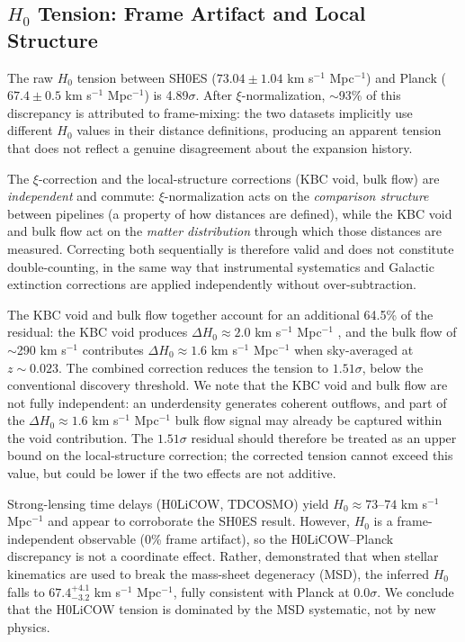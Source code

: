 \documentclass[twocolumn]{aastex631}
\begin{document}
\subsection{$H_0$ Tension: Frame Artifact and Local Structure}

The raw $H_0$ tension between SH0ES ($73.04 \pm 1.04$ km s$^{-1}$ Mpc$^{-1}$)
and Planck ($67.4 \pm 0.5$ km s$^{-1}$ Mpc$^{-1}$) is 4.89$\sigma$.
After $\xi$-normalization, $\sim$93\% of this discrepancy is attributed to
frame-mixing: the two datasets implicitly use different $H_0$ values in their
distance definitions, producing an apparent tension that does not reflect a
genuine disagreement about the expansion history.

The $\xi$-correction and the local-structure corrections (KBC void, bulk flow)
are \emph{independent} and commute: $\xi$-normalization acts on the
\emph{comparison structure} between pipelines (a property of how distances
are defined), while the KBC void and bulk flow act on the \emph{matter
distribution} through which those distances are measured.
Correcting both sequentially is therefore valid and does not constitute
double-counting, in the same way that instrumental systematics and Galactic
extinction corrections are applied independently without over-subtraction.

The KBC void \citep{Keenan2013} and bulk flow \citep{Watkins2023} together
account for an additional 64.5\% of the residual: the KBC void produces
$\Delta H_0 \approx 2.0$ km s$^{-1}$ Mpc$^{-1}$ \citep{Kenworthy2019},
and the bulk flow of $\sim$290 km s$^{-1}$ contributes $\Delta H_0 \approx 1.6$
km s$^{-1}$ Mpc$^{-1}$ when sky-averaged at $z \sim 0.023$.
The combined correction reduces the tension to $1.51\sigma$, below the
conventional discovery threshold.
We note that the KBC void and bulk flow are not fully independent: an
underdensity generates coherent outflows, and part of the $\Delta H_0 \approx
1.6$ km s$^{-1}$ Mpc$^{-1}$ bulk flow signal may already be captured within the
void contribution.
The $1.51\sigma$ residual should therefore be treated as an upper bound on the
local-structure correction; the corrected tension cannot exceed this value,
but could be lower if the two effects are not additive.

Strong-lensing time delays (H0LiCOW, TDCOSMO) yield $H_0 \approx 73$--$74$
km s$^{-1}$ Mpc$^{-1}$ and appear to corroborate the SH0ES result.
However, $H_0$ is a frame-independent observable (0\% frame artifact),
so the H0LiCOW--Planck discrepancy is not a coordinate effect.
Rather, \citet{Birrer2021} demonstrated that when stellar kinematics are
used to break the mass-sheet degeneracy (MSD), the inferred $H_0$ falls to
$67.4^{+4.1}_{-3.2}$ km s$^{-1}$ Mpc$^{-1}$, fully consistent with Planck
at 0.0$\sigma$.
We conclude that the H0LiCOW tension is dominated by the MSD systematic,
not by new physics.
\end{document}
